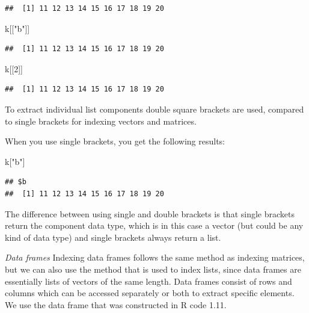 \documentclass[]{book}
\newenvironment{Shaded}{\begin{snugshade}}{\end{snugshade}}
\newcommand{\DecValTok}[1]{\textcolor[rgb]{0.00,0.00,0.81}{#1}}
\newcommand{\StringTok}[1]{\textcolor[rgb]{0.31,0.60,0.02}{#1}}
\newcommand{\NormalTok}[1]{#1}
\theoremstyle{definition}
\theoremstyle{definition}
\theoremstyle{definition}
\theoremstyle{remark}
\begin{document}
\begin{verbatim}
##  [1] 11 12 13 14 15 16 17 18 19 20
\end{verbatim}

\begin{Shaded}
\begin{Highlighting}[]
\NormalTok{k[[}\StringTok{"b"}\NormalTok{]]}
\end{Highlighting}
\end{Shaded}

\begin{verbatim}
##  [1] 11 12 13 14 15 16 17 18 19 20
\end{verbatim}

\begin{Shaded}
\begin{Highlighting}[]
\NormalTok{k[[}\DecValTok{2}\NormalTok{]]}
\end{Highlighting}
\end{Shaded}

\begin{verbatim}
##  [1] 11 12 13 14 15 16 17 18 19 20
\end{verbatim}

To extract individual list components double square brackets are used,
compared to single brackets for indexing vectors and matrices.

When you use single brackets, you get the following results:

\begin{Shaded}
\begin{Highlighting}[]
\NormalTok{k[}\StringTok{"b"}\NormalTok{]}
\end{Highlighting}
\end{Shaded}

\begin{verbatim}
## $b
##  [1] 11 12 13 14 15 16 17 18 19 20
\end{verbatim}

The difference between using single and double brackets is that single
brackets return the component data type, which is in this case a vector
(but could be any kind of data type) and single brackets always return a
list.

\emph{Data frames} Indexing data frames follows the same method as
indexing matrices, but we can also use the method that is used to index
lists, since data frames are essentially lists of vectors of the same
length. Data frames consist of rows and columns which can be accessed
separately or both to extract specific elements. We use the data frame
that was constructed in R code 1.11.
\end{document}
